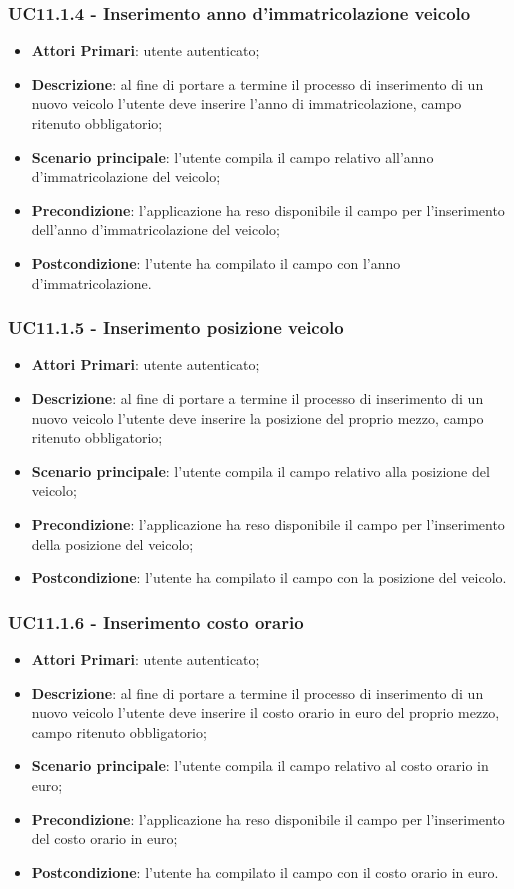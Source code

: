 \subsubsection{UC11.1.4 - Inserimento anno d'immatricolazione veicolo}
\begin{itemize}
	\item \textbf{Attori Primari}: utente autenticato;
	\item \textbf{Descrizione}: al fine di portare a termine il processo di inserimento di un nuovo veicolo l'utente deve inserire l'anno di immatricolazione, campo ritenuto obbligatorio;
	\item \textbf{Scenario principale}: l'utente compila il campo relativo all'anno d'immatricolazione del veicolo;	
	\item \textbf{Precondizione}: l'applicazione ha reso disponibile il campo per l'inserimento dell'anno d'immatricolazione del veicolo;
	\item \textbf{Postcondizione}: l'utente ha compilato il campo con l'anno d'immatricolazione.	
\end{itemize}
\subsubsection{UC11.1.5 - Inserimento posizione veicolo}
\begin{itemize}
	\item \textbf{Attori Primari}: utente autenticato;
	\item \textbf{Descrizione}: al fine di portare a termine il processo di inserimento di un nuovo veicolo l'utente deve inserire la posizione del proprio mezzo, campo ritenuto obbligatorio;
	\item \textbf{Scenario principale}: l'utente compila il campo relativo alla posizione del veicolo;	
	\item \textbf{Precondizione}: l'applicazione ha reso disponibile il campo per l'inserimento della posizione del veicolo;
	\item \textbf{Postcondizione}: l'utente ha compilato il campo con la posizione del veicolo.	
\end{itemize}
\subsubsection{UC11.1.6 - Inserimento costo orario}
\begin{itemize}
	\item \textbf{Attori Primari}: utente autenticato;
	\item \textbf{Descrizione}: al fine di portare a termine il processo di inserimento di un nuovo veicolo l'utente deve inserire il costo orario in euro del proprio mezzo, campo ritenuto obbligatorio;
	\item \textbf{Scenario principale}: l'utente compila il campo relativo al costo orario in euro;	
	\item \textbf{Precondizione}: l'applicazione ha reso disponibile il campo per l'inserimento del costo orario in euro;
	\item \textbf{Postcondizione}: l'utente ha compilato il campo con il costo orario in euro.	
\end{itemize}
